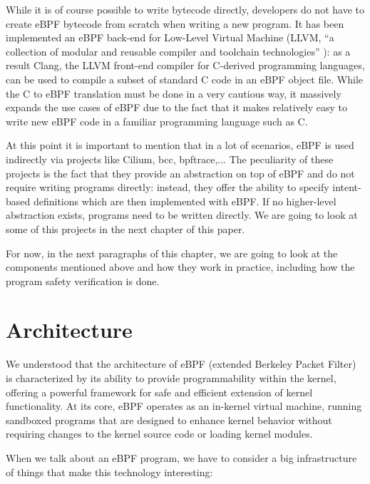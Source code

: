 While it is of course possible to write bytecode directly, developers do not have to create eBPF bytecode from scratch when writing a new program.
It has been implemented an eBPF back-end for Low-Level Virtual Machine (LLVM, ``a collection of modular and reusable compiler and toolchain technologies'' \cite{LLVMWebsite}): as a result Clang, the LLVM front-end compiler for C-derived programming languages, can be used to compile a subset of standard C code in an eBPF object file.
While the C to eBPF translation must be done in a very cautious way, it massively expands the use cases of eBPF due to the fact that it makes relatively easy to write new eBPF code in a familiar programming language such as C.

At this point it is important to mention that in a lot of scenarios, eBPF is used indirectly via projects like Cilium, bcc, bpftrace,... 
The peculiarity of these projects is the fact that they provide an abstraction on top of eBPF and do not require writing programs directly: instead, they offer the ability to specify intent-based definitions which are then implemented with eBPF.
If no higher-level abstraction exists, programs need to be written directly. 
We are going to look at some of this projects in the next chapter of this paper.

For now, in the next paragraphs of this chapter, we are going to look at the  components mentioned above and how they work in practice, including how the program safety verification is done.

\section{Architecture}

We understood that the architecture of eBPF (extended Berkeley Packet Filter) is characterized by its ability to provide programmability within the kernel, offering a powerful framework for safe and efficient extension of kernel functionality. 
At its core, eBPF operates as an in-kernel virtual machine, running sandboxed programs that are designed to enhance kernel behavior without requiring changes to the kernel source code or loading kernel modules.

When we talk about an eBPF program, we have to consider a big infrastructure of things that make this technology interesting:

